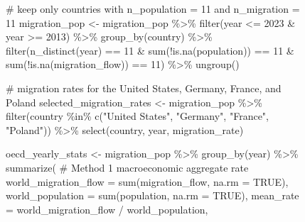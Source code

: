 \documentclass[
  letterpaper,
  DIV=11,
  numbers=noendperiod]{scrartcl}
\newenvironment{Shaded}{\begin{snugshade}}{\end{snugshade}}
\newcommand{\AttributeTok}[1]{\textcolor[rgb]{0.40,0.45,0.13}{#1}}
\newcommand{\CommentTok}[1]{\textcolor[rgb]{0.37,0.37,0.37}{#1}}
\newcommand{\ConstantTok}[1]{\textcolor[rgb]{0.56,0.35,0.01}{#1}}
\newcommand{\DecValTok}[1]{\textcolor[rgb]{0.68,0.00,0.00}{#1}}
\newcommand{\FunctionTok}[1]{\textcolor[rgb]{0.28,0.35,0.67}{#1}}
\newcommand{\NormalTok}[1]{\textcolor[rgb]{0.00,0.23,0.31}{#1}}
\newcommand{\OtherTok}[1]{\textcolor[rgb]{0.00,0.23,0.31}{#1}}
\newcommand{\SpecialCharTok}[1]{\textcolor[rgb]{0.37,0.37,0.37}{#1}}
\newcommand{\StringTok}[1]{\textcolor[rgb]{0.13,0.47,0.30}{#1}}
\begin{document}
\begin{figure}
{\begin{Shaded}
\begin{Highlighting}[]
\CommentTok{\# keep only countries with n\_population = 11 and n\_migration = 11}
\NormalTok{migration\_pop }\OtherTok{\textless{}{-}}\NormalTok{ migration\_pop }\SpecialCharTok{\%\textgreater{}\%}
  \FunctionTok{filter}\NormalTok{(year }\SpecialCharTok{\textless{}=} \DecValTok{2023} \SpecialCharTok{\&}\NormalTok{ year }\SpecialCharTok{\textgreater{}=} \DecValTok{2013}\NormalTok{) }\SpecialCharTok{\%\textgreater{}\%}
  \FunctionTok{group\_by}\NormalTok{(country) }\SpecialCharTok{\%\textgreater{}\%}
  \FunctionTok{filter}\NormalTok{(}\FunctionTok{n\_distinct}\NormalTok{(year) }\SpecialCharTok{==} \DecValTok{11} \SpecialCharTok{\&} \FunctionTok{sum}\NormalTok{(}\SpecialCharTok{!}\FunctionTok{is.na}\NormalTok{(population)) }\SpecialCharTok{==} \DecValTok{11} \SpecialCharTok{\&} \FunctionTok{sum}\NormalTok{(}\SpecialCharTok{!}\FunctionTok{is.na}\NormalTok{(migration\_flow)) }\SpecialCharTok{==} \DecValTok{11}\NormalTok{) }\SpecialCharTok{\%\textgreater{}\%}
  \FunctionTok{ungroup}\NormalTok{()}

\CommentTok{\# migration rates for the United States, Germany, France, and Poland}
\NormalTok{selected\_migration\_rates }\OtherTok{\textless{}{-}}\NormalTok{ migration\_pop }\SpecialCharTok{\%\textgreater{}\%}
  \FunctionTok{filter}\NormalTok{(country }\SpecialCharTok{\%in\%} \FunctionTok{c}\NormalTok{(}\StringTok{"United States"}\NormalTok{, }\StringTok{"Germany"}\NormalTok{, }\StringTok{"France"}\NormalTok{, }\StringTok{"Poland"}\NormalTok{)) }\SpecialCharTok{\%\textgreater{}\%}
  \FunctionTok{select}\NormalTok{(country, year, migration\_rate)}

\NormalTok{oecd\_yearly\_stats }\OtherTok{\textless{}{-}}\NormalTok{ migration\_pop }\SpecialCharTok{\%\textgreater{}\%}
  \FunctionTok{group\_by}\NormalTok{(year) }\SpecialCharTok{\%\textgreater{}\%}
  \FunctionTok{summarize}\NormalTok{(}
    \CommentTok{\# Method 1 macroeconomic aggregate rate}
    \AttributeTok{world\_migration\_flow =} \FunctionTok{sum}\NormalTok{(migration\_flow, }\AttributeTok{na.rm =} \ConstantTok{TRUE}\NormalTok{),}
    \AttributeTok{world\_population =} \FunctionTok{sum}\NormalTok{(population, }\AttributeTok{na.rm =} \ConstantTok{TRUE}\NormalTok{),}
    \AttributeTok{mean\_rate =}\NormalTok{ world\_migration\_flow }\SpecialCharTok{/}\NormalTok{ world\_population,}
    

\end{Highlighting}
\end{Shaded}}
\end{figure}
\end{document}
